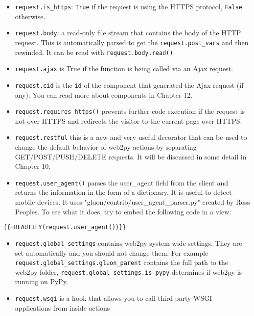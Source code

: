 \documentclass[justified,sixbynine,notoc]{tufte-book}
\def\ft{\small\tt}
\def\inxx#1{\index{#1}}
\begin{document}
\begin{fullwidth}
\begin{itemize}
\item {\ft request.is\_https}: {\ft True} if the request is using the HTTPS protocol, {\ft False} otherwise.

\item {\ft request.body}: a read-only file stream that contains the body of the HTTP request. This is automatically parsed to get the {\ft request.post\_vars} and then rewinded. It can be read with {\ft request.body.read()}.

\item {\ft request.ajax} is True if the function is being called via an Ajax request.

\item {\ft request.cid} is the {\ft id} of the component that generated the Ajax request (if any). You can read more about components in Chapter 12.

\item {\ft request.requires\_https()} prevents further code execution if the request is not over HTTPS and redirects the visitor to the current page over HTTPS.

\item {\ft request.restful} this is a new and very useful decorator that can be used to change the default behavior of web2py actions by separating GET/POST/PUSH/DELETE requests. It will be discussed in some detail in Chapter 10.

\item {\ft request.user\_agent()} parses the user\_agent field from the client and returns the information in the form of a dictionary. It is useful to detect mobile devices. It uses "gluon/contrib/user\_agent\_parser.py" created by Ross Peoples. To see what it does, try to embed the following code in a view:
\end{itemize}
\begin{lstlisting}[keywords={}]
{{=BEAUTIFY(request.user_agent())}}
\end{lstlisting}

\begin{itemize}
\item {\ft request.global\_settings} \inxx{request.global\_settings} contains web2py system wide settings. They are set automatically and you should not change them. For example {\ft request.global\_settings.gluon\_parent} contains the full path to the web2py folder, {\ft request.global\_settings.is\_pypy} determines if web2py is running on PyPy.

\item {\ft request.wsgi} is a hook that allows you to call third party WSGI applications from inside actions
\end{itemize}


\end{fullwidth}
\end{document}
